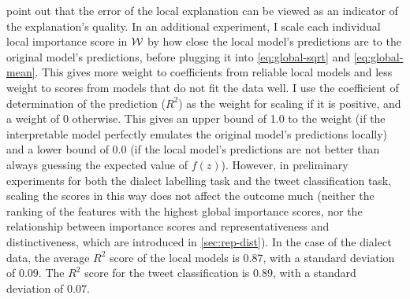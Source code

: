 \citeauthor{garreau2020explaining} point out that the error of the local explanation can be viewed as an indicator of the explanation's quality.
In an additional experiment, I scale each individual local importance score in $\mathcal{W}$ by how close the local model's predictions are to the original model's predictions, before plugging it into \autoref{eq:global-sqrt} and \autoref{eq:global-mean}.
This gives more weight to coefficients from reliable local models and less weight to scores from models that do not fit the data well.
I use the coefficient of determination of the prediction ($R^2$) as the weight for scaling if it is positive, and a weight of 0 otherwise.
This gives an upper bound of 1.0 to the weight (if the interpretable model perfectly emulates the original model's predictions locally) and a lower bound of 0.0 (if the local model's predictions are not better than always guessing the expected value of $f(z)$). 
However, in preliminary experiments for both the dialect labelling task and the tweet classification task, scaling the scores in this way does not affect the outcome much (neither the ranking of the features with the highest global importance scores, nor the relationship between importance scores and representativeness and distinctiveness, which are introduced in \autoref{sec:rep-dist}).
In the case of the dialect data, the average $R^2$ score of the local models is 0.87, with a standard deviation of 0.09.
The $R^2$ score for the tweet classification is 0.89, with a standard deviation of 0.07.
